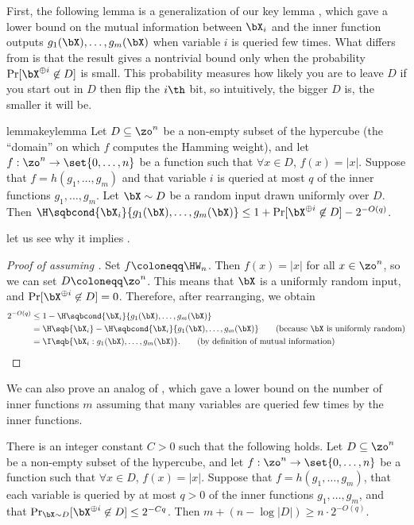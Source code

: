 First, the following lemma is a generalization of our key lemma , which gave a lower bound on the mutual information between $\bX_i$ and the inner function outputs $g_1(\bX), \ldots, g_m(\bX)$ when variable $i$ is queried few times.
What differs from  is that the result gives a nontrivial bound only when the probability $\Pr[\bX^{\oplus i} \not\in D]$
is small.
This probability measures how likely you are to leave $D$ if you start out in $D$ then flip the $i\th$ bit, so intuitively, the bigger $D$ is, the smaller it will be.
\begin{restatable}{lemma}{keylemma}
\label{lemma:main-partial}
\label{LEMMA:MAIN-PARTIAL}
Let $D \subseteq \zo^n$ be a non-empty subset of the hypercube (the ``domain'' on which $f$ computes the Hamming weight), and let
$f: \zo^n \to \set{0, \ldots, n}$ be a function such that $\forall x \in D$, $f(x) = |x|$.
Suppose that $f = h(g_1, \ldots, g_m)$ and that variable $i$ is queried  at most $q$ of the inner functions $g_1, \ldots, g_m$.
Let $\bX \sim D$ be a random input drawn uniformly over $D$.
Then $\H\sqbcond{\bX_i}{g_1(\bX), \ldots, g_m(\bX)} \leq 1 + \Pr[\bX^{\oplus i} \not\in D] - 2^{-O(q)}$.
\end{restatable}
 let us see why it implies .
\begin{proof}[Proof of  assuming ]
Set $f \coloneqq \HW_n$.
Then $f(x) = |x|$ for all $x \in \zo^n$, so we can set $D \coloneqq \zo^n$.
This means that $\bX$ is a uniformly random input, and $\Pr[\bX^{\oplus i} \not\in D] = 0$.
Therefore, after rearranging, we obtain
\begin{align*}
    2^{-O(q)}
    &\leq 1 - \H\sqbcond{\bX_i}{g_1(\bX), \ldots, g_m(\bX)}\\
    &= \H\sqb{\bX_i} - \H\sqbcond{\bX_i}{g_1(\bX), \ldots, g_m(\bX)}\tag{because $\bX$ is uniformly random}\\
    &= \I\sqb{\bX_i : g_1(\bX), \ldots, g_m(\bX)}.\tag{by definition of mutual information}
\end{align*}
\end{proof}

We can also prove an analog of , which gave a lower bound on the number of inner functions $m$ assuming that many variables are queried few times by the inner functions.
\begin{corollary}
\label{corollary:partial}
There is an integer constant $C>0$ such that the following holds.
Let $D \subseteq \zo^n$ be a non-empty subset of the hypercube, and let
$f: \zo^n \to \set{0, \ldots, n}$ be a function such that $\forall x \in D$, $f(x) = |x|$.
Suppose that $f = h(g_1, \ldots, g_m)$, that each variable is queried by at most $q>0$ of the inner functions $g_1, \ldots, g_m$, and that $\Pr_{\bX \sim D}[\bX^{\oplus i} \not \in D] \leq 2^{-Cq}$.
Then $m + (n-\log|D|) \geq n \cdot 2^{-O(q)}$.
\end{corollary}


